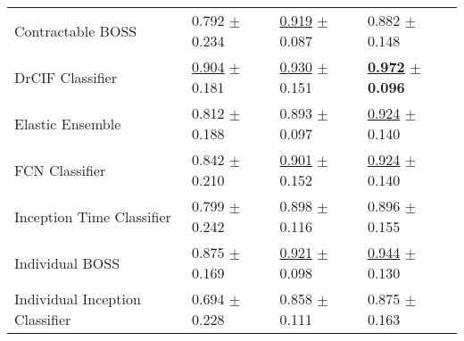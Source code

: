 \begin{tabular}{llll}
Contractable BOSS & \textcolor[rgb]{0.3221757322,0.5000000000,0}{0.792} $\pm$ \textcolor[rgb]{0.9121281608,0.0878718392,0}{0.234} & \underline{\textcolor[rgb]{0.3127962085,0.5000000000,0}{0.919}} $\pm$ \textcolor[rgb]{0.2290816130,0.5000000000,0}{0.087} & \textcolor[rgb]{0.3611111111,0.5000000000,0}{0.882} $\pm$ \textcolor[rgb]{0.4865294757,0.5000000000,0}{0.148} \\
DrCIF Classifier & \underline{\textcolor[rgb]{0.0736401674,0.5000000000,0}{0.904}} $\pm$ \textcolor[rgb]{0.6501555575,0.3498444425,0}{0.181} & \underline{\textcolor[rgb]{0.2488151659,0.5000000000,0}{0.930}} $\pm$ \textcolor[rgb]{0.9643140232,0.0356859768,0}{0.151} & \underline{\textbf{\textcolor[rgb]{0.0000000000,0.5000000000,0}{0.972}}} $\pm$ \textbf{\textcolor[rgb]{0.0000000000,0.5000000000,0}{0.096}} \\
Elastic Ensemble & \textcolor[rgb]{0.2761506276,0.5000000000,0}{0.812} $\pm$ \textcolor[rgb]{0.6846520220,0.3153479780,0}{0.188} & \textcolor[rgb]{0.4691943128,0.5000000000,0}{0.893} $\pm$ \textcolor[rgb]{0.3427404441,0.5000000000,0}{0.097} & \underline{\textcolor[rgb]{0.1944444444,0.5000000000,0}{0.924}} $\pm$ \textcolor[rgb]{0.4049258024,0.5000000000,0}{0.140} \\
FCN Classifier & \textcolor[rgb]{0.2117154812,0.5000000000,0}{0.842} $\pm$ \textcolor[rgb]{0.7904432447,0.2095567553,0}{0.210} & \underline{\textcolor[rgb]{0.4194312796,0.5000000000,0}{0.901}} $\pm$ \textcolor[rgb]{0.9727218435,0.0272781565,0}{0.152} & \underline{\textcolor[rgb]{0.1944444444,0.5000000000,0}{0.924}} $\pm$ \textcolor[rgb]{0.4049258024,0.5000000000,0}{0.140} \\
Inception Time Classifier & \textcolor[rgb]{0.3068340307,0.5000000000,0}{0.799} $\pm$ \textcolor[rgb]{0.9509603921,0.0490396079,0}{0.242} & \textcolor[rgb]{0.4360189573,0.5000000000,0}{0.898} $\pm$ \textcolor[rgb]{0.5628062518,0.4371937482,0}{0.116} & \textcolor[rgb]{0.3055555556,0.5000000000,0}{0.896} $\pm$ \textcolor[rgb]{0.5510216208,0.4489783792,0}{0.155} \\
Individual BOSS & \textcolor[rgb]{0.1380753138,0.5000000000,0}{0.875} $\pm$ \textcolor[rgb]{0.5860875168,0.4139124832,0}{0.169} & \underline{\textcolor[rgb]{0.2985781991,0.5000000000,0}{0.921}} $\pm$ \textcolor[rgb]{0.3601483136,0.5000000000,0}{0.098} & \underline{\textcolor[rgb]{0.1111111111,0.5000000000,0}{0.944}} $\pm$ \textcolor[rgb]{0.3121982484,0.5000000000,0}{0.130} \\
Individual Inception Classifier & \textcolor[rgb]{0.5369595537,0.4630404463,0}{0.694} $\pm$ \textcolor[rgb]{0.8828427405,0.1171572595,0}{0.228} & \textcolor[rgb]{0.6767772512,0.3232227488,0}{0.858} $\pm$ \textcolor[rgb]{0.5033778172,0.4966221828,0}{0.111} & \textcolor[rgb]{0.3888888889,0.5000000000,0}{0.875} $\pm$ \textcolor[rgb]{0.6233059939,0.3766940061,0}{0.163} \\

\end{tabular}
